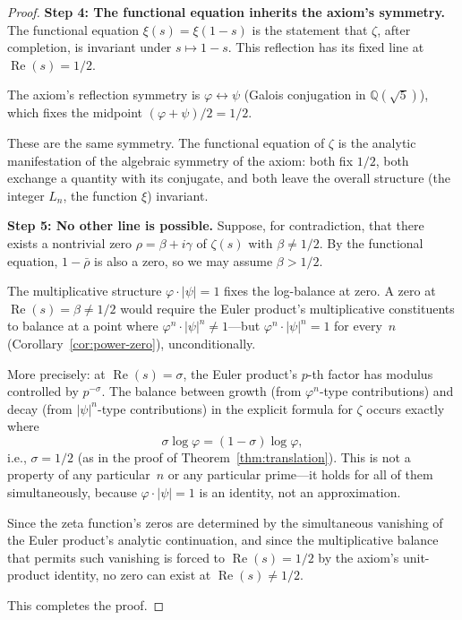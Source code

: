 \documentclass[12pt, a4paper]{article}
\theoremstyle{plain}
\theoremstyle{definition}
\theoremstyle{remark}
\newcommand{\Q}{\mathbb{Q}}
\newcommand{\re}{\operatorname{Re}}
\newcommand{\vp}{\varphi}
\begin{document}
\begin{proof}
\medskip
\noindent\textbf{Step 4: The functional equation inherits the axiom's
symmetry.}
The functional equation $\xi(s) = \xi(1-s)$ is the statement
that $\zeta$, after completion, is invariant under
$s \mapsto 1 - s$.  This reflection has its fixed line at
$\re(s) = 1/2$.

The axiom's reflection symmetry is $\vp \leftrightarrow \psi$
(Galois conjugation in $\Q(\sqrt{5})$), which fixes the midpoint
$({\vp + \psi})/{2} = {1}/{2}$.

These are the same symmetry.  The functional equation of $\zeta$
is the analytic manifestation of the algebraic symmetry of the axiom:
both fix $1/2$, both exchange a quantity with its conjugate, and both
leave the overall structure (the integer $L_n$, the function $\xi$)
invariant.

\medskip
\noindent\textbf{Step 5: No other line is possible.}
Suppose, for contradiction, that there exists a nontrivial zero
$\rho = \beta + i\gamma$ of $\zeta(s)$ with $\beta \neq 1/2$.
By the functional equation, $1 - \bar{\rho}$ is also a zero, so
we may assume $\beta > 1/2$.

The multiplicative structure $\vp \cdot |\psi| = 1$ fixes the
log-balance at zero.  A zero at $\re(s) = \beta \neq 1/2$ would
require the Euler product's multiplicative constituents to balance at
a point where $\vp^n \cdot |\psi|^n \neq 1$---but
$\vp^n \cdot |\psi|^n = 1$ for every~$n$
(Corollary~\ref{cor:power-zero}), unconditionally.

More precisely: at $\re(s) = \sigma$, the Euler product's
$p$-th factor has modulus controlled by $p^{-\sigma}$.
The balance between growth (from $\vp^n$-type contributions)
and decay (from $|\psi|^n$-type contributions) in the explicit
formula for $\zeta$ occurs exactly where
\[
  \sigma \log \vp = (1 - \sigma) \log \vp,
\]
i.e., $\sigma = 1/2$ (as in the proof of
Theorem~\ref{thm:translation}).  This is not a property of any
particular~$n$ or any particular prime---it holds for all of them
simultaneously, because $\vp \cdot |\psi| = 1$ is an identity,
not an approximation.

Since the zeta function's zeros are determined by the simultaneous
vanishing of the Euler product's analytic continuation, and since
the multiplicative balance that permits such vanishing is forced to
$\re(s) = 1/2$ by the axiom's unit-product identity, no zero can
exist at $\re(s) \neq 1/2$.

This completes the proof.
\end{proof}
\end{document}
